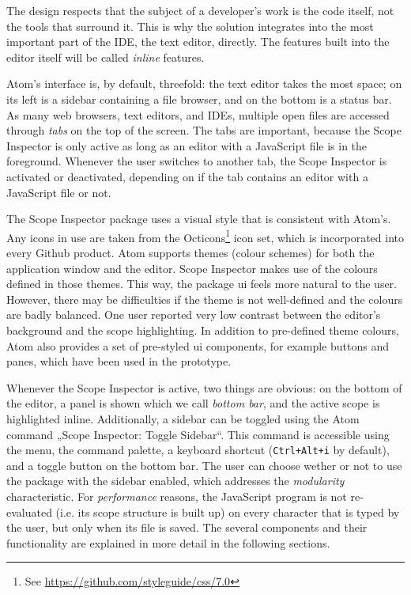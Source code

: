 The design respects that the subject of a developer’s work is the code
itself, not the tools that surround it. This is why the solution
integrates into the most important part of the IDE, the text editor,
directly. The features built into the editor itself will be called
\emph{inline} features.

Atom’s interface is, by default, threefold: the text editor takes the
most space; on its left is a sidebar containing a file browser, and on
the bottom is a status bar. As many web browsers, text editors, and
IDEs, multiple open files are accessed through \emph{tabs} on the top of
the screen. The tabs are important, because the Scope Inspector is only
active as long as an editor with a JavaScript file is in the foreground.
Whenever the user switches to another tab, the Scope Inspector is
activated or deactivated, depending on if the tab contains an editor
with a JavaScript file or not.

The Scope Inspector package uses a visual style that is consistent with
Atom’s. Any icons in use are taken from the
Octicons\footnote{See \url{https://github.com/styleguide/css/7.0}} icon
set, which is incorporated into every Github product. Atom supports
themes (colour schemes) for both the application window and the editor.
Scope Inspector makes use of the colours defined in those themes. This
way, the package \ac{ui} feels more natural to the user. However, there
may be difficulties if the theme is not well-defined and the colours are
badly balanced. One user reported very low contrast between the editor’s
background and the scope highlighting. In addition to pre-defined theme
colours, Atom also provides a set of pre-styled \ac{ui} components, for
example buttons and panes, which have been used in the prototype.

Whenever the Scope Inspector is active, two things are obvious: on the
bottom of the editor, a panel is shown which we call \emph{bottom bar},
and the active scope is highlighted inline. Additionally, a sidebar can
be toggled using the Atom command „Scope Inspector: Toggle Sidebar“.
This command is accessible using the menu, the command palette, a
keyboard shortcut (\texttt{Ctrl+Alt+i} by default), and a toggle button
on the bottom bar. The user can choose wether or not to use the package
with the sidebar enabled, which addresses the \emph{modularity}
characteristic. For \emph{performance} reasons, the JavaScript program
is not re-evaluated (i.e. its scope structure is built up) on every
character that is typed by the user, but only when its file is saved.
The several components and their functionality are explained in more
detail in the following sections.

